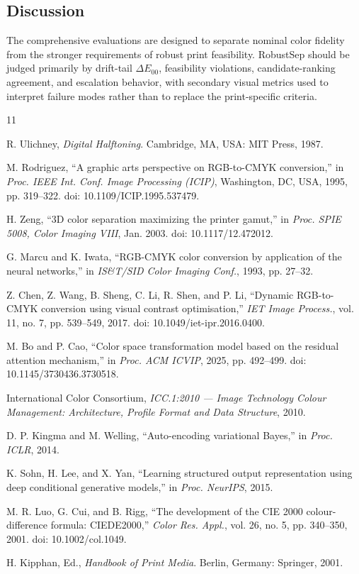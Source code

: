 \documentclass[acmsmall,screen,nonacm]{acmart}
\begin{document}
\subsection{Discussion}

The comprehensive evaluations are designed to separate nominal color fidelity from the stronger requirements of robust print feasibility. RobustSep should be judged primarily by drift-tail $\Delta E_{00}$, feasibility violations, candidate-ranking agreement, and escalation behavior, with secondary visual metrics used to interpret failure modes rather than to replace the print-specific criteria.

\begin{thebibliography}{11}

R. Ulichney,
\textit{Digital Halftoning}.
Cambridge, MA, USA: MIT Press, 1987.

M. Rodriguez,
``A graphic arts perspective on RGB-to-CMYK conversion,''
in \textit{Proc. IEEE Int. Conf. Image Processing (ICIP)}, Washington, DC, USA, 1995, pp. 319--322.
doi: 10.1109/ICIP.1995.537479.

H. Zeng,
``3D color separation maximizing the printer gamut,''
in \textit{Proc. SPIE 5008, Color Imaging VIII}, Jan. 2003.
doi: 10.1117/12.472012.

G. Marcu and K. Iwata,
``RGB-CMYK color conversion by application of the neural networks,''
in \textit{IS\&T/SID Color Imaging Conf.}, 1993, pp. 27--32.

Z. Chen, Z. Wang, B. Sheng, C. Li, R. Shen, and P. Li,
``Dynamic RGB-to-CMYK conversion using visual contrast optimisation,''
\textit{IET Image Process.}, vol. 11, no. 7, pp. 539--549, 2017.
doi: 10.1049/iet-ipr.2016.0400.

M. Bo and P. Cao,
``Color space transformation model based on the residual attention mechanism,''
in \textit{Proc. ACM ICVIP}, 2025, pp. 492--499.
doi: 10.1145/3730436.3730518.

International Color Consortium,
\textit{ICC.1:2010 --- Image Technology Colour Management: Architecture, Profile Format and Data Structure},
2010.

D. P. Kingma and M. Welling,
``Auto-encoding variational Bayes,''
in \textit{Proc. ICLR}, 2014.

K. Sohn, H. Lee, and X. Yan,
``Learning structured output representation using deep conditional generative models,''
in \textit{Proc. NeurIPS}, 2015.

M. R. Luo, G. Cui, and B. Rigg,
``The development of the CIE 2000 colour-difference formula: CIEDE2000,''
\textit{Color Res. Appl.}, vol. 26, no. 5, pp. 340--350, 2001.
doi: 10.1002/col.1049.

H. Kipphan, Ed.,
\textit{Handbook of Print Media}.
Berlin, Germany: Springer, 2001.

\end{thebibliography}
\end{document}
